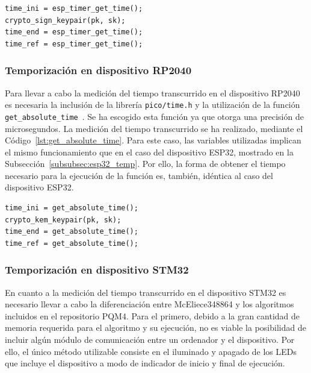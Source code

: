 \begin{lstlisting}[label={lst:esp_timer_get_time},style=Bashnice,firstnumber=1,caption={Medición temporal en el dispositivo ESP32.}]
time_ini = esp_timer_get_time();
crypto_sign_keypair(pk, sk);
time_end = esp_timer_get_time();
time_ref = esp_timer_get_time();
\end{lstlisting}


\subsubsection{Temporización en dispositivo RP2040}\label{subsubsec:rp2040_temp}

Para llevar a cabo la medición del tiempo transcurrido en el dispositivo RP2040 es necesaria la inclusión de la librería \texttt{pico/time.h} y la utilización de la función \texttt{get\_absolute\_time}~\cite{get_absolute_time}.
Se ha escogido esta función ya que otorga una precisión de microsegundos.
La medición del tiempo transcurrido se ha realizado, mediante el Código~\ref{lst:get_absolute_time}.
Para este caso, las variables utilizadas implican el mismo funcionamiento que en el caso del dispositivo ESP32, mostrado en la Subsección~\ref{subsubsec:esp32_temp}.
Por ello, la forma de obtener el tiempo necesario para la ejecución de la función es, también, idéntica al caso del dispositivo ESP32.

\begin{lstlisting}[label={lst:get_absolute_time},style=Bashnice,firstnumber=1,caption={Medición temporal en el dispositivo RP2040.}]
time_ini = get_absolute_time();
crypto_kem_keypair(pk, sk);
time_end = get_absolute_time();
time_ref = get_absolute_time();
\end{lstlisting}

\subsubsection{Temporización en dispositivo STM32}\label{subsubsec:stm32_temp}

En cuanto a la medición del tiempo transcurrido en el dispositivo STM32 es necesario llevar a cabo la diferenciación entre McEliece348864 y los algoritmos incluidos en el repositorio PQM4.
Para el primero, debido a la gran cantidad de memoria requerida para el algoritmo y su ejecución, no es viable la posibilidad de incluir algún módulo de comunicación entre un ordenador y el dispositivo.
Por ello, el único método utilizable consiste en el iluminado y apagado de los LEDs que incluye el dispositivo a modo de indicador de inicio y final de ejecución.

